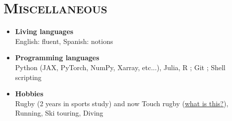 \documentclass{article}
\begin{document}
\section*{\textsc{Miscellaneous}}
\begin{itemize}
    \item[] \textbf{Living languages} \\[.1 cm] 
        \tabto{2cm} English: fluent, Spanish: notions
    \item[] \textbf{Programming languages} \\[.1 cm] 
        \tabto{2cm} Python (JAX, PyTorch, NumPy, Xarray, etc...), Julia, R ; Git ; Shell scripting
    \item[] \textbf{Hobbies} \\[.1 cm] 
        \tabto{2cm} Rugby (2 years in sports study) and now Touch rugby (\href{https://youtu.be/yE_VXFf4pCk?si=aiIs_IFJW4eTuIwQ}{what is this?}), Running, Ski touring, Diving
\end{itemize}
\end{document}
